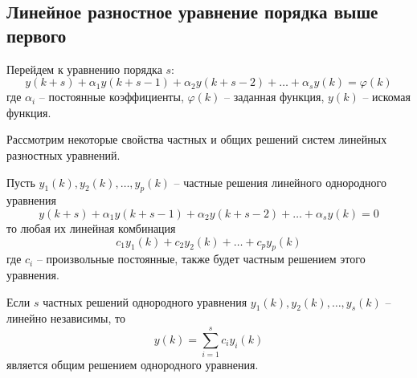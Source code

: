 \documentclass[../../calc-math-exam-2023.tex]{subfiles}
\begin{document}
    \subsection{Линейное разностное уравнение порядка выше первого}
    Перейдем к уравнению порядка $s$:
    \begin{equation}
        y(k+s) + \alpha_1 y(k+s-1) + \alpha_2 y(k+s-2) + \dots + \alpha_s y(k) = \varphi(k)\label{eq:diff-s}
    \end{equation}
    где $\displaystyle \alpha_i$ -- постоянные коэффициенты, $\varphi(k)$ -- заданная функция, $y(k)$ -- искомая функция.

    Рассмотрим некоторые свойства частных и общих решений систем линейных разностных уравнений.
    \begin{theorem}
        Пусть $\displaystyle y_1(k), y_2(k), \dots, y_p(k)$ -- частные решения линейного однородного уравнения
        \begin{equation}
            y(k+s) + \alpha_1 y(k+s-1) + \alpha_2 y(k+s-2) + \dots + \alpha_s y(k) = 0\label{eq:diff-s1}
        \end{equation}
        то любая их линейная комбинация
        \begin{equation*}
            c_1 y_1 (k) + c_2 y_2 (k) + \dots + c_p y_p (k)
        \end{equation*}
        где $\displaystyle c_i$ -- произвольные постоянные, также будет частным решением этого уравнения.
    \end{theorem}
    \begin{theorem}
        Если $s$ частных решений однородного уравнения $\displaystyle y_1(k), y_2(k), \dots, y_s(k)$ -- линейно независимы, то
        \begin{equation}
            y(k) = \sum_{i=1}^{s} c_i y_i (k)\label{eq:diff-s2}
        \end{equation}
        является общим решением однородного уравнения.
    \end{theorem}
\end{document}
